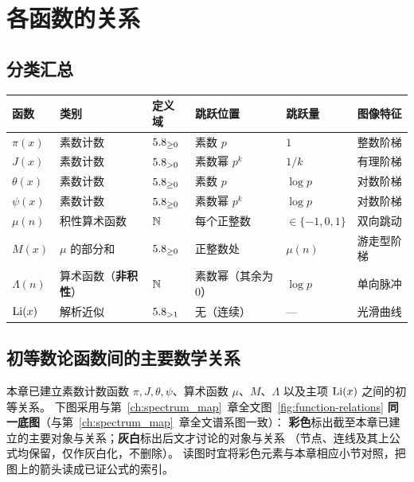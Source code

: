 \section{各函数的关系}\label{sec:relations_seven_functions}
 
\subsection{分类汇总}
 
\begin{center}
\renewcommand{\arraystretch}{1.6}
\begin{tabular}{llllll}
\toprule
函数 & 类别 & 定义域 & 跳跃位置 & 跳跃量 & 图像特征 \\
\midrule
$\pi(x)$ & 素数计数 & $5.8_{\geq 0}$ & 素数 $p$ & $1$ & 整数阶梯 \\
$J(x)$ & 素数计数 & $5.8_{>0}$ & 素数幂 $p^k$ & $1/k$ & 有理阶梯 \\
$\theta(x)$ & 素数计数 & $5.8_{\geq 0}$ & 素数 $p$ & $\log p$ & 对数阶梯 \\
$\psi(x)$ & 素数计数 & $5.8_{\geq 0}$ & 素数幂 $p^k$ & $\log p$ & 对数阶梯 \\
$\mu(n)$ & 积性算术函数 & $\operatorname{\mathbb{N}}$ & 每个正整数 & $\in\{-1,0,1\}$ & 双向跳动 \\
$M(x)$ & $\mu$ 的部分和 & $5.8_{\geq 0}$ & 正整数处 & $\mu(n)$ & 游走型阶梯 \\
$\Lambda(n)$ & 算术函数（\textbf{非积性}） & $\operatorname{\mathbb{N}}$ & 素数幂（其余为 $0$） & $\log p$ & 单向脉冲 \\
$\operatorname{Li}(x)$ & 解析近似 & $5.8_{>1}$ & 无（连续） & — & 光滑曲线 \\
\bottomrule
\end{tabular}
\end{center}
 
\newpage
\subsection{初等数论函数间的主要数学关系}
\label{sec:elementary_spectrum_map}

本章已建立素数计数函数 $\pi,J,\theta,\psi$、算术函数 $\mu$、$M$、$\Lambda$ 以及主项 $\operatorname{Li}(x)$ 之间的初等关系。
下图采用与第~\ref{ch:spectrum_map}~章全文图~\ref{fig:function-relations}
\textbf{同一底图}（与第~\ref{ch:spectrum_map}~章全文谱系图一致）：
\textbf{彩色}标出截至本章已建立的主要对象与关系；\textbf{灰白}标出后文才讨论的对象与关系
（节点、连线及其上公式均保留，仅作灰白化，不删除）。
读图时宜将彩色元素与本章相应小节对照，把图上的箭头读成已证公式的索引。

